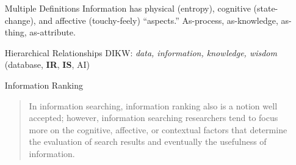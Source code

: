 \documentclass{article}
\begin{document}
\begin{itemize}
    {\bf People -- Information Searching}
    \begin{itemize}
        \item {\it Least Effort}
        \item {\it Iterative Process}
    \end{itemize}

    {\bf People -- Both}
    \begin{itemize}
        \item {\it Interaction}
        \item {\it Resolving an Uncertainty}
    \end{itemize}

    {\bf People -- Information Retrieval}
    \begin{itemize}
        \item {\it Provision} (assumed that providing information helps a user accomplish some task)
    \end{itemize}

    {\bf Technology -- Information Searching}
    \begin{itemize}
        \item {\it Channel Preference}
    \end{itemize}

    {\bf Technology -- Both}
    \begin{itemize}
        \item {\it Information Obtainability}
    \end{itemize}

    {\bf Technology -- Information Retrieval}
    \begin{itemize}
        \item {\it Query} (transformed input)
        \item {\it Neutrality of Technology}
        \item {\it Memex Vision}
    \end{itemize}

    \item[Multiple Definitions] Information has physical (entropy), cognitive (state-change), and affective (touchy-feely) ``aspects.''  As-process, as-knowledge, as-thing, as-attribute.

    \item[Hierarchical Relationships] DIKW: {\it data, information, knowledge, wisdom} ({\footnotesize database, {\bf IR}, {\bf IS}, AI})

    \item[Information Ranking]
        \begin{quote}
            In information searching, information ranking also is a notion well accepted; however, information searching researchers tend to focus more on the cognitive, affective, or contextual factors that determine the evaluation of search results and eventually the usefulness of information.
        \end{quote}


\end{itemize}
\end{document}
